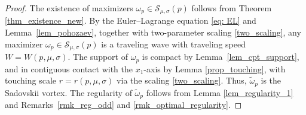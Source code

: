 \documentclass[11pt]{amsart}
\theoremstyle{definition}
\theoremstyle{definition}
\numberwithin{equation}{section}
\newcommand{\tld}[1]{\widetilde{#1}}
\newcommand{\0}{\emptyset}
\newcommand{\calS}{\mathcal S}
\begin{document}
			\begin{proof}
				The existence of maximizers $\omega_p\in \calS_{\mu,\sigma}(p)$ follows from Theorem \ref{thm_existence_new}.
                By the Euler--Lagrange equation \eqref{eq: EL} and Lemma~\ref{lem_pohozaev}, together with two-parameter scaling \eqref{two_scaling}, any maximizer $\omega_p \in \calS_{\mu,\sigma}(p)$ is a traveling wave with traveling speed $W = W(p, \mu, \sigma)$.
				The support of $\omega_p$ is compact by Lemma~\ref{lem_cpt_support}, and in contiguous contact with the $x_1$-axis by Lemma \ref{prop_touching}, with touching scale $r = r(p, \mu, \sigma)$ via the scaling \eqref{two_scaling}.
                Thus, $\tld{\omega}_p$ is the Sadovskii vortex.
                The regularity of $\tld{\omega}_p$ follows from Lemma \ref{lem_regularity_1} and Remarks~\ref{rmk_reg_odd} and \ref{rmk_optimal_regularity}.
				

\end{proof}
\end{document}
